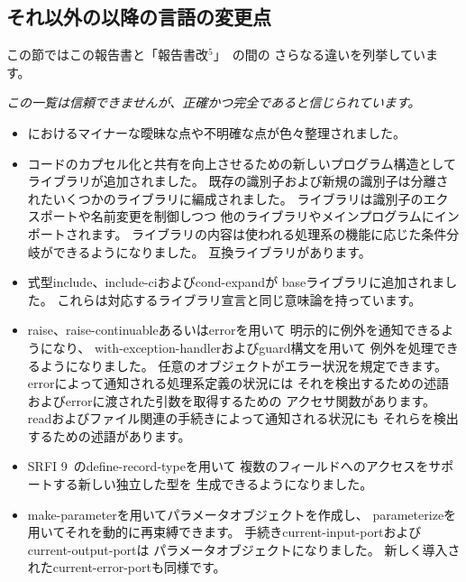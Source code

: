 \subsection*{それ以外の\rfivers{}以降の言語の変更点}
\label{differences}
この節ではこの報告書と「報告書改$^5$」~\cite{R5RS}の間の
さらなる違いを列挙しています。

{\em この一覧は信頼できませんが、正確かつ完全であると信じられています。}

\begin{itemize}

\item \rfivers{}におけるマイナーな曖昧な点や不明確な点が色々整理されました。

\item コードのカプセル化と共有を向上させるための新しいプログラム構造として
ライブラリが追加されました。
既存の識別子および新規の識別子は分離されたいくつかのライブラリに編成されました。
ライブラリは識別子のエクスポートや名前変更を制御しつつ
他のライブラリやメインプログラムにインポートされます。
ライブラリの内容は使われる処理系の機能に応じた条件分岐ができるようになりました。
\rfivers 互換ライブラリがあります。

\item 式型{\cf include}、{\cf include-ci}および{\cf cond-expand}が
baseライブラリに追加されました。
これらは対応するライブラリ宣言と同じ意味論を持っています。

\item {\cf raise}、{\cf raise-continuable}あるいは{\cf error}を用いて
明示的に例外を通知できるようになり、
{\cf with-\+exception-\+handler}および{\cf guard}構文を用いて
例外を処理できるようになりました。
任意のオブジェクトがエラー状況を規定できます。
{\cf error}によって通知される処理系定義の状況には
それを検出するための述語および{\cf error}に渡された引数を取得するための
アクセサ関数があります。
{\cf read}およびファイル関連の手続きによって通知される状況にも
それらを検出するための述語があります。

\item SRFI 9~\cite{srfi9}の{\cf define-record-type}を用いて
複数のフィールドへのアクセスをサポートする新しい独立した型を
生成できるようになりました。

\item {\cf make-parameter}を用いてパラメータオブジェクトを作成し、
{\cf parameterize}を用いてそれを動的に再束縛できます。
手続き{\cf current-\+input-\+port}および{\cf current-\+output-\+port}は
パラメータオブジェクトになりました。
新しく導入された{\cf current-\+error-\+port}も同様です。


\end{itemize}
